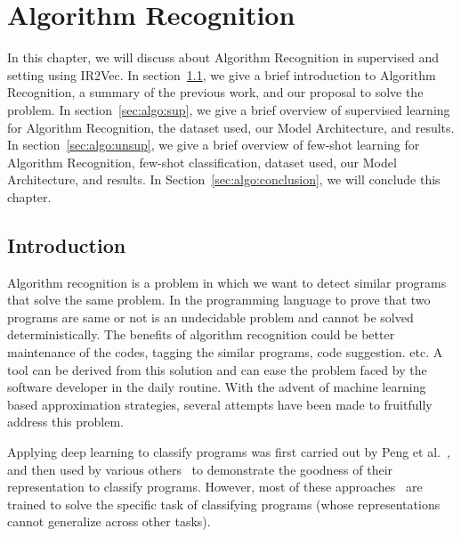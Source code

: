 \chapter{Algorithm Recognition}
\label{chap:ch3}
In this chapter, we will discuss about Algorithm Recognition in supervised and  setting using IR2Vec. 
In section~\ref{sec:algo:intro}, we give a brief introduction to Algorithm Recognition, a summary of the previous work, and our proposal to solve the problem. 
In section~\ref{sec:algo:sup}, we give a brief overview of supervised learning for Algorithm Recognition, the dataset used, our Model Architecture, and results. 
In section~\ref{sec:algo:unsup}, we give a brief overview of few-shot learning for Algorithm Recognition, few-shot classification, dataset used, our Model Architecture, and results. 
In Section~\ref{sec:algo:conclusion}, we will conclude this chapter.


\section{Introduction}\label{sec:algo:intro}
Algorithm recognition is a problem in which we want to detect similar programs that solve the same problem. In the programming language to prove that two programs are same or not is an undecidable problem and cannot be solved deterministically. The benefits of algorithm recognition could be better maintenance of the codes, tagging the similar programs, code suggestion. etc.   A tool can be derived from this solution and can ease the problem faced by the software developer in the daily routine. With the advent of machine learning based approximation strategies, several attempts have been made to fruitfully address this problem.


Applying deep learning to classify programs was first carried out by Peng et al.~\cite{Peng:2015}, and then used by various others~\cite{tbcnn-aaai16,ncc,Chen:2019} to demonstrate the goodness of their representation to classify programs. 
However, most of these approaches~\cite{Peng:2015,tbcnn-aaai16,Chen:2019} are trained to solve the specific task of classifying programs (whose representations cannot generalize across other tasks).

